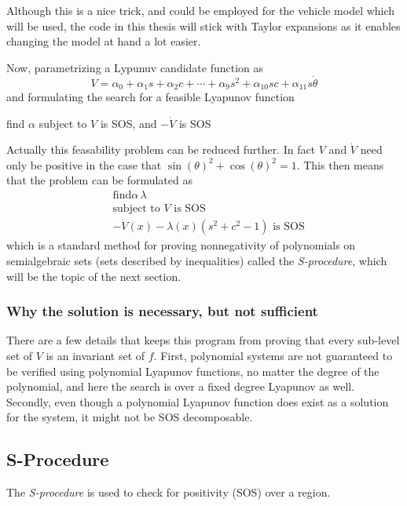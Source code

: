 Although this is a nice trick, and could be employed for the vehicle model which
will be used, the code in this thesis will stick with Taylor expansions as it
enables changing the model at hand a lot easier.

Now, parametrizing a Lypunuv candidate function as
\[
  V = \alpha_0 + \alpha_1s + \alpha_2c + \cdots + \alpha_9s^2 + \alpha_{10}sc +
  \alpha_{11}s\dot{\theta}
\]
and formulating the search for a feasible Lyapunov function
\begin{example}
  find \(\alpha\) subject to \(V\) is SOS, and \(-\dot{V}\) is SOS
\end{example}

Actually this feasability problem can be reduced further. In fact \(V\) and
\(\dot{V}\) need only be positive in the case that \(\sin{(\theta)}^2 +
\cos{(\theta)}^2 = 1\). This then means that the problem can be formulated as
\begin{align*}
  &\text{find}\alpha\, \lambda \\
  &\text{subject to } V \text{ is SOS} \\
  &-\dot{V}(x) - \lambda(x)\left( s^2 + c^2 -1 \right) \text{ is SOS}
\end{align*}
which is a standard method for proving nonnegativity of polynomials on
semialgebraic sets (sets described by inequalities) called the
\textit{S-procedure}, which will be the topic of the next section.

\subsubsection{Why the solution is necessary, but not sufficient}

There are a few details that keeps this program from proving that every
sub-level set of \(V\) is an invariant set of \(f\). First, polynomial systems
are not guaranteed to be verified using polynomial Lyapunov functions, no matter
the degree of the polynomial, and here the search is over a fixed degree
Lyapunov as well. Secondly, even though a polynomial Lyapunov function does
exist as a solution for the system, it might not be \ac{SOS} decomposable.

\subsection{S-Procedure}
\label{sec:s-procedure}

The \textit{S-procedure} is used to check for positivity (SOS) over a region.

